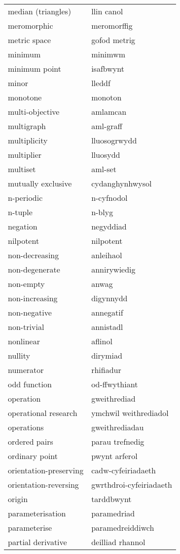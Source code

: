\begin{supertabular}{p{0.22\textwidth}p{0.22\textwidth}}
median (triangles) & llin canol \\
meromorphic & meromorffig \\
metric space & gofod metrig \\
minimum & minimwm \\
minimum point & isafbwynt \\
minor & lleddf \\
monotone & monoton \\
multi-objective & amlamcan \\
multigraph & aml-graff \\
multiplicity & lluosogrwydd \\
multiplier & lluosydd \\
multiset & aml-set \\
mutually exclusive & cydanghynhwysol \\
n-periodic & n-cyfnodol \\
n-tuple & n-blyg \\
negation & negyddiad \\
nilpotent & nilpotent \\
non-decreasing & anleihaol \\
non-degenerate & annirywiedig \\
non-empty & anwag \\
non-increasing & digynnydd \\
non-negative & annegatif \\
non-trivial & annistadl \\
nonlinear & aflinol \\
nullity & dirymiad \\
numerator & rhifiadur \\
odd function & od-ffwythiant \\
operation & gweithrediad \\
operational research & ymchwil weithrediadol \\
operations & gweithrediadau \\
ordered pairs & parau trefnedig \\
ordinary point & pwynt arferol \\
orientation-preserving & cadw-cyfeiriadaeth \\
orientation-reversing & gwrthdroi-cyfeiriadaeth \\
origin & tarddbwynt \\
parameterisation & paramedriad \\
parameterise & paramedreiddiwch \\
partial derivative & deilliad rhannol \\

\end{supertabular}
